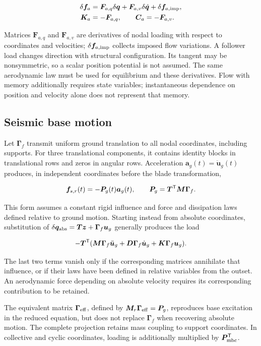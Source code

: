 \begin{align}
\delta\bm f_a&=\bm F_{a,q}\delta\bm q+\bm F_{a,v}\delta\dot{\bm q}
+\delta\bm f_{a,\rm imp},\nonumber\\
\bm K_a&=-\bm F_{a,q},\qquad \bm C_a=-\bm F_{a,v}.
\end{align}

Matrices $\bm F_{a,q}$ and $\bm F_{a,v}$ are derivatives of nodal loading with respect to coordinates and velocities; $\delta\bm f_{a,\rm imp}$ collects imposed flow variations. A follower load changes direction with structural configuration. Its tangent may be nonsymmetric, so a scalar position potential is not assumed. The same aerodynamic law must be used for equilibrium and these derivatives. Flow with memory additionally requires state variables; instantaneous dependence on position and velocity alone does not represent that memory.

\subsection{Seismic base motion}
Let $\bm\Gamma_f$ transmit uniform ground translation to all nodal coordinates, including supports. For three translational components, it contains identity blocks in translational rows and zeros in angular rows. Acceleration $\bm a_g(t)=\ddot{\bm u}_g(t)$ produces, in independent coordinates before the blade transformation,

\begin{equation}
\bm f_{s,r}(t)=-\bm P_g(t)\bm a_g(t),\qquad
\bm P_g=\bm T^\mathsf T\bm M\bm\Gamma_f.
\label{eq:seismic}
\end{equation}

This form assumes a constant rigid influence and force and dissipation laws defined relative to ground motion. Starting instead from absolute coordinates, substitution of $\delta\bm q_{\rm abs}=\bm T\bm z+\bm\Gamma_f\bm u_g$ generally produces the load

\begin{equation}
-\bm T^\mathsf T(\bm M\bm\Gamma_f\ddot{\bm u}_g
+\bm D\bm\Gamma_f\dot{\bm u}_g+\bm K\bm\Gamma_f\bm u_g).
\end{equation}

The last two terms vanish only if the corresponding matrices annihilate that influence, or if their laws have been defined in relative variables from the outset. An aerodynamic force depending on absolute velocity requires its corresponding contribution to be retained.

The equivalent matrix $\bm\Gamma_{\rm eff}$, defined by $\bm M_r\bm\Gamma_{\rm eff}=\bm P_g$, reproduces base excitation in the reduced equation, but does not replace $\bm\Gamma_f$ when recovering absolute motion. The complete projection retains mass coupling to support coordinates. In collective and cyclic coordinates, loading is additionally multiplied by $\bm P_{\rm mbc}^\mathsf T$.

